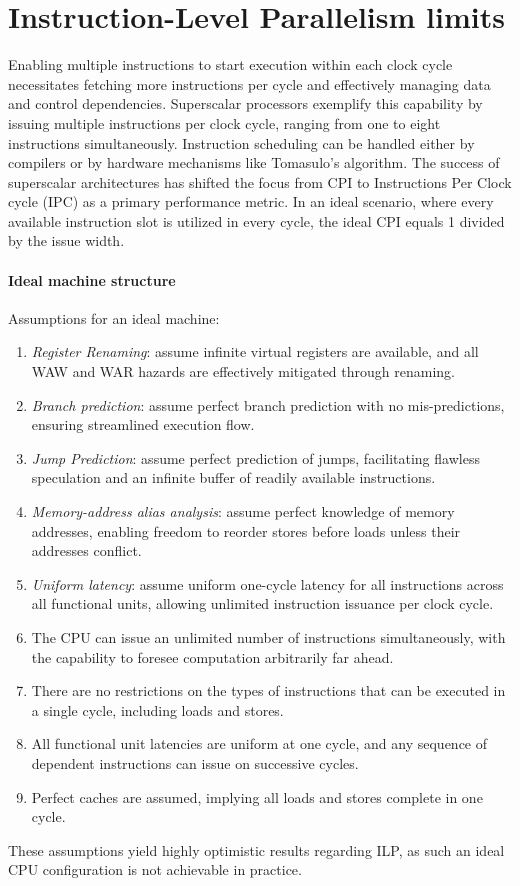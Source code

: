\section{Instruction-Level Parallelism limits}

Enabling multiple instructions to start execution within each clock cycle necessitates fetching more instructions per cycle and effectively managing data and control dependencies. 
Superscalar processors exemplify this capability by issuing multiple instructions per clock cycle, ranging from one to eight instructions simultaneously. 
Instruction scheduling can be handled either by compilers or by hardware mechanisms like Tomasulo's algorithm. 
The success of superscalar architectures has shifted the focus from CPI to Instructions Per Clock cycle (IPC) as a primary performance metric.
In an ideal scenario, where every available instruction slot is utilized in every cycle, the ideal CPI equals 1 divided by the issue width.

\paragraph*{Ideal machine structure}
Assumptions for an ideal machine:
\begin{enumerate}
    \item \textit{Register Renaming}: assume infinite virtual registers are available, and all WAW and WAR hazards are effectively mitigated through renaming.
    \item \textit{Branch prediction}: assume perfect branch prediction with no mis-predictions, ensuring streamlined execution flow.
    \item \textit{Jump Prediction}: assume perfect prediction of jumps, facilitating flawless speculation and an infinite buffer of readily available instructions.
    \item \textit{Memory-address alias analysis}: assume perfect knowledge of memory addresses, enabling freedom to reorder stores before loads unless their addresses conflict.
    \item \textit{Uniform latency}: assume uniform one-cycle latency for all instructions across all functional units, allowing unlimited instruction issuance per clock cycle.
    \item The CPU can issue an unlimited number of instructions simultaneously, with the capability to foresee computation arbitrarily far ahead.
    \item There are no restrictions on the types of instructions that can be executed in a single cycle, including loads and stores.
    \item All functional unit latencies are uniform at one cycle, and any sequence of dependent instructions can issue on successive cycles.
    \item  Perfect caches are assumed, implying all loads and stores complete in one cycle.
\end{enumerate}
These assumptions yield highly optimistic results regarding ILP, as such an ideal CPU configuration is not achievable in practice.

